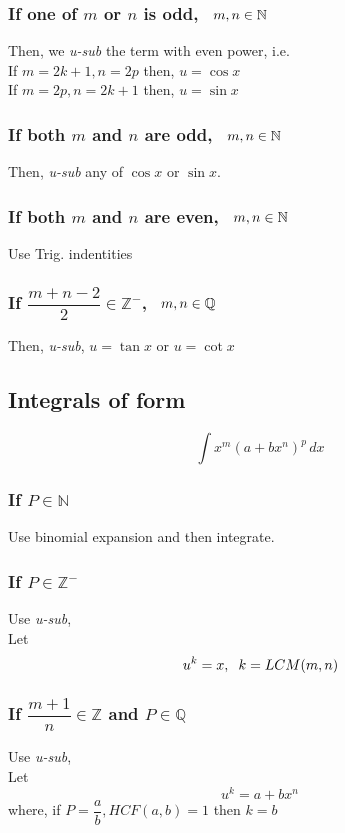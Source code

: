 \documentclass{article}
\begin{document}
\subsubsection{If one of $m$ or $n$ is odd, $\hspace{2mm} m,n \in \mathbb{N}$ }
Then, we \textit{u-sub} the term with even power, i.e.
\\
If $m=2k+1, n=2p$ then, $u=\cos x$ \\
If $m=2p, n=2k+1$ then, $u=\sin x$
\subsubsection{If both $m$ and $n$ are odd, $\hspace{2mm} m,n \in \mathbb{N}$}
Then, \textit{u-sub} any of $\cos x$ or $\sin x$.
\subsubsection{If both $m$ and $n$ are even, $\hspace{2mm} m,n \in \mathbb{N}$}
Use Trig. indentities
\subsubsection{If $\dfrac{m+n-2}{2} \in \mathbb{Z^-}$, $\hspace{2mm} m,n \in \mathbb{Q}$}
Then, \textit{u-sub}, $u=\tan x$ or $u=\cot x$
\subsection{Integrals of form }
$$\displaystyle\int x^m (a+bx^n)^p \, dx$$
\subsubsection{If $P \in \mathbb{N}$}
Use binomial expansion and then integrate.
\subsubsection{If $P \in \mathbb{Z^-}$}
Use \textit{u-sub},
\\
Let $$u^k=x, \hspace{2mm} k = LCM(m,n)$$
\subsubsection{If $\dfrac{m+1}{n} \in \mathbb{Z}$ and $P \in \mathbb{Q}$}
Use \textit{u-sub},
\\
Let $$u^k=a+bx^n$$
where, if $P=\dfrac{a}{b}, HCF(a,b)=1$ then $k=b$
\end{document}
